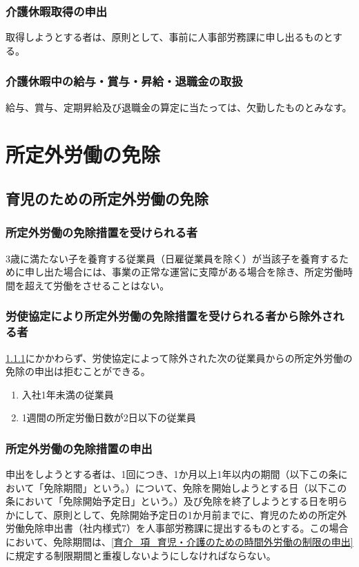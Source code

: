 \documentclass{jsarticle}
\begin{document}
\subsubsection{介護休暇取得の申出}
\label{育介_項_介護休暇取得の申出}
取得しようとする者は、原則として、事前に人事部労務課に申し出るものとする。 

\subsubsection{介護休暇中の給与・賞与・昇給・退職金の取扱}
\label{育介_項_介護休暇中の給与・賞与・昇給・退職金の取扱}
給与、賞与、定期昇給及び退職金の算定に当たっては、欠勤したものとみなす。

\section{所定外労働の免除}

\subsection{育児のための所定外労働の免除}
\label{育介_条_育児のための所定外労働の免除}

\subsubsection{所定外労働の免除措置を受けられる者}
\label{育介_項_所定外労働の免除措置を受けられる者}
3歳に満たない子を養育する従業員（日雇従業員を除く）が当該子を養育するために申し出た場合には、事業の正常な運営に支障がある場合を除き、所定労働時間を超えて労働をさせることはない。 

\subsubsection{労使協定により所定外労働の免除措置を受けられる者から除外される者}
\label{育介_項_労使協定により所定外労働の免除措置を受けられる者から除外される者}
\ref{育介_項_所定外労働の免除措置を受けられる者}にかかわらず、労使協定によって除外された次の従業員からの所定外労働の免除の申出は拒むことができる。 
\begin{enumerate}
  \item 入社1年未満の従業員
  \item 1週間の所定労働日数が2日以下の従業員
\end{enumerate}

\subsubsection{所定外労働の免除措置の申出}
\label{育介_項_所定外労働の免除措置の申出}
申出をしようとする者は、1回につき、1か月以上1年以内の期間（以下この条において「免除期間」という。）について、免除を開始しようとする日（以下この条において「免除開始予定日」という。）及び免除を終了しようとする日を明らかにして、原則として、免除開始予定日の1か月前までに、育児のための所定外労働免除申出書（社内様式7）を人事部労務課に提出するものとする。この場合において、免除期間は、\ref{育介_項_育児・介護のための時間外労働の制限の申出}に規定する制限期間と重複しないようにしなければならない。
\end{document}
